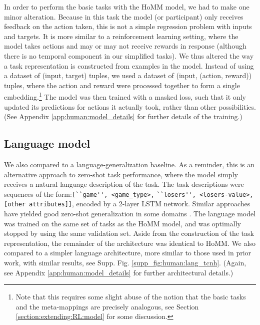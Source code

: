 In order to perform the basic tasks with the HoMM model, we had to make one minor alteration. Because in this task the model (or participant) only receives feedback on the action taken, this is not a simple regression problem with inputs and targets. It is more similar to a reinforcement learning setting, where the model takes actions and may or may not receive rewards in response (although there is no temporal component in our simplified tasks). We thus altered the way a task representation is constructed from examples in the model. Instead of using a dataset of (input, target) tuples, we used a dataset of (input, (action, reward)) tuples, where the action and reward were processed together to form a single embedding.\footnote{Note that this requires some slight abuse of the notion that the basic tasks and the meta-mappings are precisely analogous, see Section \ref{section:extending:RL:model} for some discussion.} The model was then trained with a masked loss, such that it only updated its predictions for actions it actually took, rather than other possibilities. (See Appendix \ref{app:human:model_details} for further details of the training.) \par

\subsection{Language model}

We also compared to a language-generalization baseline. As a reminder, this is an alternative approach to zero-shot task performance, where the model simply receives a natural language description of the task. The task descriptions were sequences of the form:\verb|[``game'', <game_type>,| \verb|``losers'', <losers-value>, [other attributes]]|, encoded by a 2-layer LSTM network. Similar approaches have yielded good zero-shot generalization in some domains \citep[e.g.][]{Hermann2017}. The language model was trained on the same set of tasks as the HoMM model, and was optimally stopped by using the same validation set. Aside from the construction of the task representation, the remainder of the architecture was identical to HoMM. We also compared to a simpler language architecture, more similar to those used in prior work, with similar results, see Supp. Fig. \ref{supp_fig:human:lang_tcnh}. (Again, see Appendix \ref{app:human:model_details} for further architectural details.)


